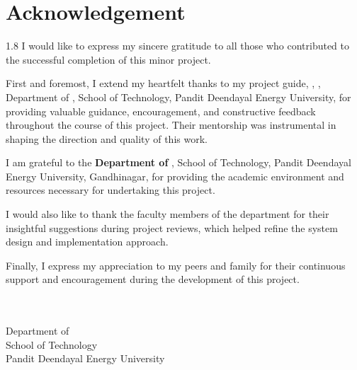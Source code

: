 \chapter*{Acknowledgement}

\begin{spacing}{1.8}
I would like to express my sincere gratitude to all those who contributed to the successful completion of this minor project.

First and foremost, I extend my heartfelt thanks to my project guide, \textbf{\guidename}, \guidedesignation, Department of \department, School of Technology, Pandit Deendayal Energy University, for providing valuable guidance, encouragement, and constructive feedback throughout the course of this project. Their mentorship was instrumental in shaping the direction and quality of this work.

I am grateful to the \textbf{Department of \department}, School of Technology, Pandit Deendayal Energy University, Gandhinagar, for providing the academic environment and resources necessary for undertaking this project.

I would also like to thank the faculty members of the department for their insightful suggestions during project reviews, which helped refine the system design and implementation approach.

Finally, I express my appreciation to my peers and family for their continuous support and encouragement during the development of this project.

\vspace{1.5cm}

\noindent
\textbf{\studentname} \\
\rollnumber \\
Department of \department \\
School of Technology \\
Pandit Deendayal Energy University
\end{spacing}
